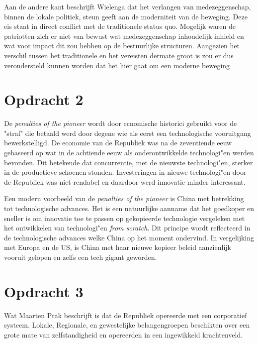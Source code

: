 \documentclass[11pt]{amsart}
\begin{document}
Aan de andere kant beschrijft Wielenga dat het verlangen van medezeggenschap, binnen de lokale politiek, steun geeft aan de moderniteit van de beweging. \autocite[182]{wielengaGeschiedenisVanNederland2022} 
Deze eis staat in direct conflict met de traditionele status quo.
Mogelijk waren de patriotten zich er niet van bewust wat medezeggenschap inhoudelijk inhield en wat voor impact dit zou hebben op de bestuurlijke structuren. Aangezien het verschil tussen het traditionele en het vereisten dermate groot is zou er dus verondersteld kunnen worden dat het hier gaat om een moderne beweging

\section*{Opdracht 2}
De \textit{penalties of the pioneer} wordt door ecnomische historici gebruikt voor de "straf" die betaald werd door degene wie als eerst een technologische vooruitgang bewerkstelligd. De economie van de Republiek  was na de zeventiende eeuw gebaseerd op wat in de achtiende eeuw als onderontwikkelde technologi"en werden bevonden. Dit betekende dat concurrentie, met de nieuwste technologi"en, sterker in de productieve schoenen stonden. Investeringen in nieuwe technologi"en door de Republiek was niet rendabel en daardoor werd innovatie minder interessant.\autocite[187]{wielengaGeschiedenisVanNederland2022}

Een modern voorbeeld van de \textit{penalties of the pioneer} is China met betrekking tot technologische advances. Het is een natuurlijke aanname dat het goedkoper en sneller is om innovatie toe te passen op gekopieerde technologie vergeleken met het ontwikkelen van technologi"en \textit{from scratch}. Dit principe wordt reflecteerd in de technologische advances welke China op het moment ondervind. In vergelijking met Europa en de US, is China met haar nieuwe kopieer beleid aanzienlijk vooruit gelopen en zelfs een tech gigant geworden.

\section*{Opdracht 3}
Wat Maarten Prak beschrijft is dat de Republiek opereerde met een corporatief systeem. Lokale, Regionale, en gewestelijke belangengroepen beschikten over een grote mate van zelfstandigheid en opereerden in een ingewikkeld krachtenveld.\autocite[188]{wielengaGeschiedenisVanNederland2022}
\end{document}
